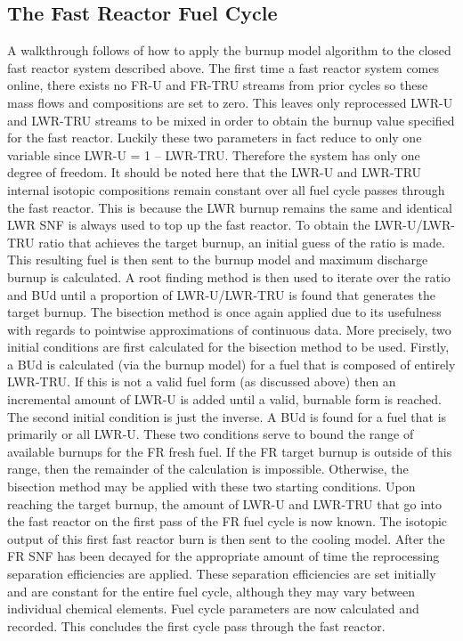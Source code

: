 \subsection{The Fast Reactor Fuel Cycle}
\label{1g_sec:FRFC}
A walkthrough follows of how to apply the burnup model algorithm to the closed fast reactor system described above.  The first time a fast reactor system comes online, there exists no FR-U and FR-TRU streams from prior cycles so these mass flows and compositions are set to zero.   This leaves only reprocessed LWR-U and LWR-TRU streams to be mixed in order to obtain the burnup value specified for the fast reactor.  Luckily these two parameters in fact reduce to only one variable since LWR-U = 1 – LWR-TRU.  Therefore the system has only one degree of freedom.  
It should be noted here that the LWR-U and LWR-TRU internal isotopic compositions remain constant over all fuel cycle passes through the fast reactor.  This is because the LWR burnup remains the same  and identical LWR SNF is always used to top up the fast reactor.  
To obtain the LWR-U/LWR-TRU ratio that achieves the target burnup, an initial guess of the ratio is made.  This resulting fuel is then sent to the burnup model and maximum discharge burnup is calculated.  A root finding method is then used to iterate over the ratio and BUd until a proportion of LWR-U/LWR-TRU is found that generates the target burnup.  The bisection method is once again applied due to its usefulness with regards to pointwise approximations of continuous data.
More precisely, two initial conditions are first calculated for the bisection method to be used.  Firstly, a BUd is calculated (via the burnup model) for a fuel that is composed of entirely LWR-TRU.  If this is not a valid fuel form (as discussed above) then an incremental amount of LWR-U is added until a valid, burnable form is reached.  The second initial condition is just the inverse.  A BUd is found for a fuel that is primarily or all LWR-U.  These two conditions serve to bound the range of available burnups for the FR fresh fuel.  If the FR target burnup is outside of this range, then the remainder of the calculation is impossible.  Otherwise, the bisection method may be applied with these two starting conditions.  Upon reaching the target burnup, the amount of LWR-U and LWR-TRU that go into the fast reactor on the first pass of the FR fuel cycle is now known.
The isotopic output of this first fast reactor burn is then sent to the cooling model.   After the FR SNF has been decayed for the appropriate amount of time the reprocessing separation efficiencies are applied.  These separation efficiencies are set initially and are constant for the entire fuel cycle, although they may vary between individual chemical elements.  Fuel cycle parameters are now calculated and recorded.  This concludes the first cycle pass through the fast reactor.  
